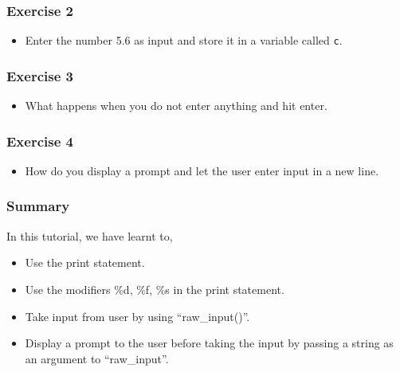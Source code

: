 \documentclass[presentation]{beamer}
\begin{document}
\begin{frame}
\frametitle{Exercise 2}
\label{sec-4}


\begin{itemize}
\item Enter the number 5.6 as input and store it in a variable called
  \verb~c~.
\end{itemize}
\end{frame}
\begin{frame}
\frametitle{Exercise 3}
\label{sec-5}


\begin{itemize}
\item What happens when you do not enter anything and hit enter.
\end{itemize}
\end{frame}
\begin{frame}
\frametitle{Exercise 4}
\label{sec-6}


\begin{itemize}
\item How do you display a prompt and let the user enter input in a new line.
\end{itemize}
\end{frame}
\begin{frame}
\frametitle{Summary}
\label{sec-7}

 In this tutorial, we have learnt to,


\begin{itemize}
\item Use the print statement.
\item Use the modifiers \%d, \%f, \%s in the print statement.
\item Take input from user by using ``raw\_input()''.
\item Display a prompt to the user before taking the input by passing 
    a string as an argument to ``raw\_input''.
\end{itemize}
\end{frame}
\end{document}
